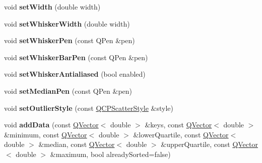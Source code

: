 \begin{DoxyCompactItemize}
\item 
\mbox{\label{class_q_c_p_statistical_box_a0b62775bd67301b1eba5c785f2b26f14}} 
void {\bfseries set\+Width} (double width)
\item 
\mbox{\label{class_q_c_p_statistical_box_adf378812446bd66f34d1f7f293d991cd}} 
void {\bfseries set\+Whisker\+Width} (double width)
\item 
\mbox{\label{class_q_c_p_statistical_box_a4a5034cb3b9b040444df05ab1684620b}} 
void {\bfseries set\+Whisker\+Pen} (const Q\+Pen \&pen)
\item 
\mbox{\label{class_q_c_p_statistical_box_aa8d3e503897788e1abf68dc74b5f147f}} 
void {\bfseries set\+Whisker\+Bar\+Pen} (const Q\+Pen \&pen)
\item 
\mbox{\label{class_q_c_p_statistical_box_a61bcd458fba002f72304d11319051843}} 
void {\bfseries set\+Whisker\+Antialiased} (bool enabled)
\item 
\mbox{\label{class_q_c_p_statistical_box_a7260ac55b669f5d0a74f16d5ca84c52c}} 
void {\bfseries set\+Median\+Pen} (const Q\+Pen \&pen)
\item 
\mbox{\label{class_q_c_p_statistical_box_ad5241943422eb8e58360a97e99ad6aa7}} 
void {\bfseries set\+Outlier\+Style} (const \hyperlink{class_q_c_p_scatter_style}{Q\+C\+P\+Scatter\+Style} \&style)
\item 
\mbox{\label{class_q_c_p_statistical_box_a9a8739c5b8291db8fd839e892fc8f478}} 
void {\bfseries add\+Data} (const \hyperlink{class_q_vector}{Q\+Vector}$<$ double $>$ \&keys, const \hyperlink{class_q_vector}{Q\+Vector}$<$ double $>$ \&minimum, const \hyperlink{class_q_vector}{Q\+Vector}$<$ double $>$ \&lower\+Quartile, const \hyperlink{class_q_vector}{Q\+Vector}$<$ double $>$ \&median, const \hyperlink{class_q_vector}{Q\+Vector}$<$ double $>$ \&upper\+Quartile, const \hyperlink{class_q_vector}{Q\+Vector}$<$ double $>$ \&maximum, bool already\+Sorted=false)
\item 
\mbox{\label{class_q_c_p_statistical_box_a026f2790b530d6f29312254ecb1e7c1e}} 

\end{DoxyCompactItemize}

